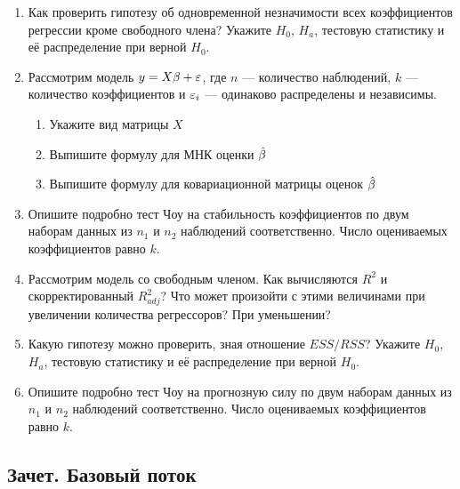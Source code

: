 \documentclass[12pt, a4paper]{article}\usepackage[]{graphicx}\usepackage[]{color}
\begin{document}
\begin{enumerate}
\item Как проверить гипотезу об одновременной незначимости всех коэффициентов регрессии кроме свободного члена? Укажите $H_0$, $H_a$, тестовую статистику и её распределение при верной $H_0$.
\item Рассмотрим модель $y=X\beta + \varepsilon$, где $n$ — количество наблюдений, $k$ — количество коэффициентов и $\varepsilon_i$ — одинаково распределены и независимы.
\begin{enumerate}
\item Укажите вид матрицы $X$
\item Выпишите формулу для МНК оценки $\hat{\beta}$
\item Выпишите формулу для ковариационной матрицы оценок $\hat{\beta}$
\end{enumerate}
\item Опишите подробно тест Чоу на стабильность коэффициентов по двум наборам данных из $n_1$ и $n_2$ наблюдений соответственно. Число оцениваемых коэффициентов равно $k$.
\item Рассмотрим модель со свободным членом. Как вычисляются $R^2$ и скорректированный $R^2_{adj}$? Что может произойти с этими величинами при увеличении количества регрессоров? При уменьшении?
\item Какую гипотезу можно проверить, зная отношение $ESS/RSS$? Укажите $H_0$, $H_a$, тестовую статистику и её распределение при верной $H_0$.
\item Опишите подробно тест Чоу на прогнозную силу по двум наборам данных из $n_1$ и $n_2$ наблюдений соответственно. Число оцениваемых коэффициентов равно $k$.
\end{enumerate}


\subsection{Зачет. Базовый поток}
\end{document}
